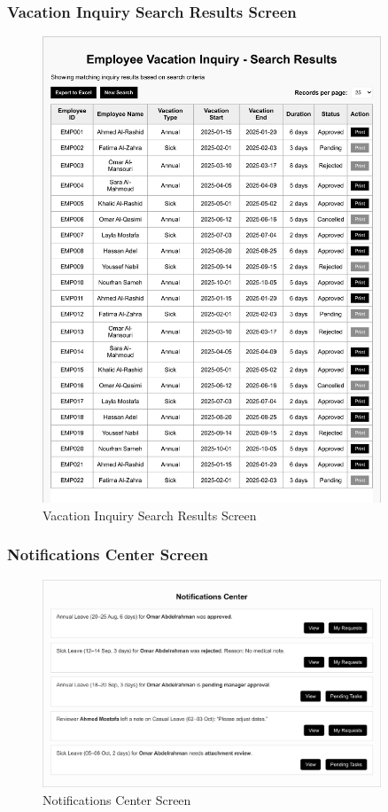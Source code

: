 \documentclass[12pt,a4paper]{article}
\begin{document}
\subsubsection{Vacation Inquiry Search Results Screen}
\begin{figure}[H]
\centering
\includegraphics[width=0.9\textwidth]{Wireframes/Employee-Vacation-Inquiry-Search-Results/Employee-Vacation-Inquiry-Search-Results-1.png}
\caption{Vacation Inquiry Search Results Screen}
\label{fig:inquiry-search-results-screen}
\end{figure}

\subsubsection{Notifications Center Screen}
\begin{figure}[H]
\centering
\includegraphics[width=0.9\textwidth]{Wireframes/Notifications-Center/Notifications-Center-1.png}
\caption{Notifications Center Screen}
\label{fig:notifications-center-screen}
\end{figure}
\end{document}
